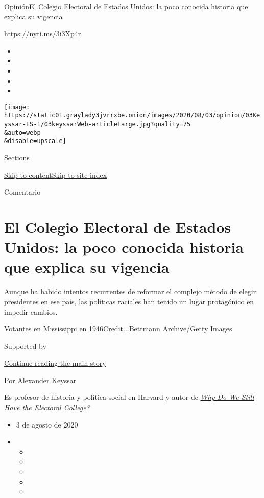 \href{/es/section/opinion}{Opinión}\textbar{}El Colegio Electoral de
Estados Unidos: la poco conocida historia que explica su vigencia

\url{https://nyti.ms/3i3Xp4r}

\begin{itemize}
\item
\item
\item
\item
\item
\end{itemize}

\texttt{[image: https://static01.graylady3jvrrxbe.onion/images/2020/08/03/opinion/03Keyssar-ES-1/03keyssarWeb-articleLarge.jpg?quality=75\\\&auto=webp\\\&disable=upscale]}

Sections

\protect\hyperlink{site-content}{Skip to
content}\protect\hyperlink{site-index}{Skip to site index}

Comentario

\hypertarget{el-colegio-electoral-de-estados-unidos-la-poco-conocida-historia-que-explica-su-vigencia}{%
\section{El Colegio Electoral de Estados Unidos: la poco conocida
historia que explica su
vigencia}\label{el-colegio-electoral-de-estados-unidos-la-poco-conocida-historia-que-explica-su-vigencia}}

Aunque ha habido intentos recurrentes de reformar el complejo método de
elegir presidentes en ese país, las políticas raciales han tenido un
lugar protagónico en impedir cambios.

Votantes en Mississippi en 1946Credit...Bettmann Archive/Getty Images

Supported by

\protect\hyperlink{after-sponsor}{Continue reading the main story}

Por Alexander Keyssar

Es profesor de historia y política social en Harvard y autor de
\href{https://www.hup.harvard.edu/catalog.php?isbn=9780674660151\#:~:text=After\%20tracing\%20the\%20Electoral\%20College's,showing\%20why\%20each\%20has\%20failed.}{\emph{Why
Do We Still Have the Electoral College}}\emph{?}

\begin{itemize}
\item
  3 de agosto de 2020
\item
  \begin{itemize}
  \item
  \item
  \item
  \item
  \item
  \end{itemize}
\end{itemize}

